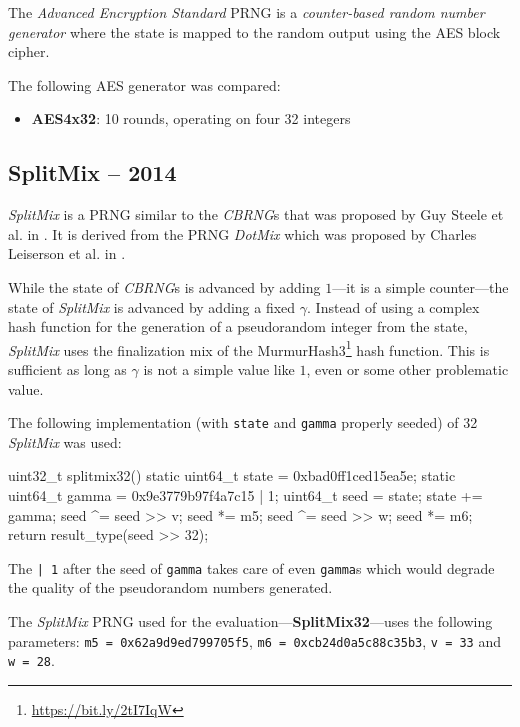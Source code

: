     The \emph{Advanced Encryption Standard} PRNG is a \emph{counter-based random number generator} where the state is mapped to the random output using the AES block cipher.

    The following AES generator was compared:
    \begin{itemize}
		\itemsep0em
        \item \textbf{AES4x32}: 10 rounds, operating on four \SI{32}{\bit} integers
    \end{itemize}

\subsection[SplitMix -- 2014]{SplitMix -- 2014} \label{subsec:splitmix}

    \emph{SplitMix} is a PRNG similar to the \emph{CBRNG}s that was proposed by Guy Steele et al. in \cite{Steele:2014}. It is derived from the PRNG \emph{DotMix} which was proposed by Charles Leiserson et al. in \cite{Leiserson:2012}.

    While the state of \emph{CBRNG}s is advanced by adding $1$---it is a simple counter---the state of \emph{SplitMix} is advanced by adding a fixed $\gamma$. Instead of using a complex hash function for the generation of a pseudorandom integer from the state, \emph{SplitMix} uses the finalization mix of the MurmurHash3\footnote[10]{\url{https://bit.ly/2tI7IqW}} hash function. This is sufficient as long as $\gamma$ is not a simple value like $1$, even or some other problematic value.

    The following implementation (with \lstinline|state| and \lstinline|gamma| properly seeded) of \SI{32}{\bit} \emph{SplitMix} was used:
\begin{@empty}
    \lstset{
        language = [ISO]C++
    }
\begin{centeredshadowboxlisting}
uint32_t splitmix32() {
    static uint64_t state = 0xbad0ff1ced15ea5e;
    static uint64_t gamma = 0x9e3779b97f4a7c15
                          | 1;
    uint64_t seed = state;
    state += gamma;
    seed ^= seed >> v;
    seed *= m5;
    seed ^= seed >> w;
    seed *= m6;
    return result_type(seed >> 32);
}
\end{centeredshadowboxlisting}
\end{@empty}
    The \lstinline{| 1} after the seed of \lstinline|gamma| takes care of even \lstinline|gamma|s which would degrade the quality of the pseudorandom numbers generated.

    The \emph{SplitMix} PRNG used for the evaluation---\textbf{SplitMix32}---uses the following parameters: \lstinline|m5 = 0x62a9d9ed799705f5|, \lstinline|m6 = 0xcb24d0a5c88c35b3|, \lstinline|v = 33| and \lstinline|w = 28|.

